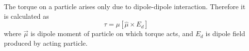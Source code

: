 The torque on a particle arises only due to dipole-dipole interaction. Therefore it is calculated as
\begin{equation}
\label{eq:dipole_torque}
	\tau  = \mu[\hat{\mu} \times E_d ]
\end{equation}
where $\vec{\mu}$ is dipole moment of particle on which torque acts, and $E_d$ is dipole field produced by acting particle.

